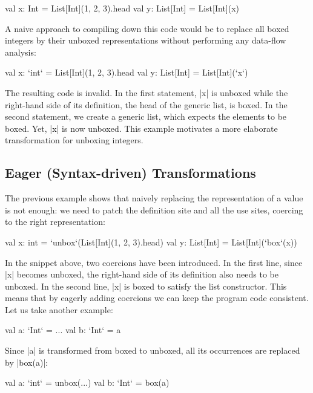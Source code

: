 \begin{lstlisting-nobreak}
 val x: Int = List[Int](1, 2, 3).head
 val y: List[Int] = List[Int](x)
\end{lstlisting-nobreak}

A naive approach to compiling down this code would be to replace all boxed integers by their unboxed representations without performing any data-flow analysis:

\begin{lstlisting-nobreak}
 val x: `int` = List[Int](1, 2, 3).head
 val y: List[Int] = List[Int](`x`)
\end{lstlisting-nobreak}

The resulting code is invalid. In the first statement, |x| is unboxed while the right-hand side of its definition, the head of the generic list, is boxed. In the second statement, we create a generic list, which expects the elements to be boxed. Yet, |x| is now unboxed. This example motivates a more elaborate transformation for unboxing integers.

\subsection{Eager (Syntax-driven) Transformations}

The previous example shows that naively replacing the representation of a value is not enough: we need to patch the definition site and all the use sites, coercing to the right representation:

\begin{lstlisting-nobreak}
 val x: int = `unbox`(List[Int](1, 2, 3).head)
 val y: List[Int] = List[Int](`box`(x))
\end{lstlisting-nobreak}

In the snippet above, two coercions have been introduced. In the first line, since |x| becomes unboxed, the right-hand side of its definition also needs to be unboxed. In the second line, |x| is boxed to satisfy the list constructor. This means that by eagerly adding coercions we can keep the program code consistent. Let us take another example:

\begin{lstlisting-nobreak}
 val a: `Int` = ...
 val b: `Int` = a
\end{lstlisting-nobreak}

Since |a| is transformed from boxed to unboxed, all its occurrences are replaced by |box(a)|:

\begin{lstlisting-nobreak}
 val a: `int` = unbox(...)
 val b: `Int` = box(a)
\end{lstlisting-nobreak}

